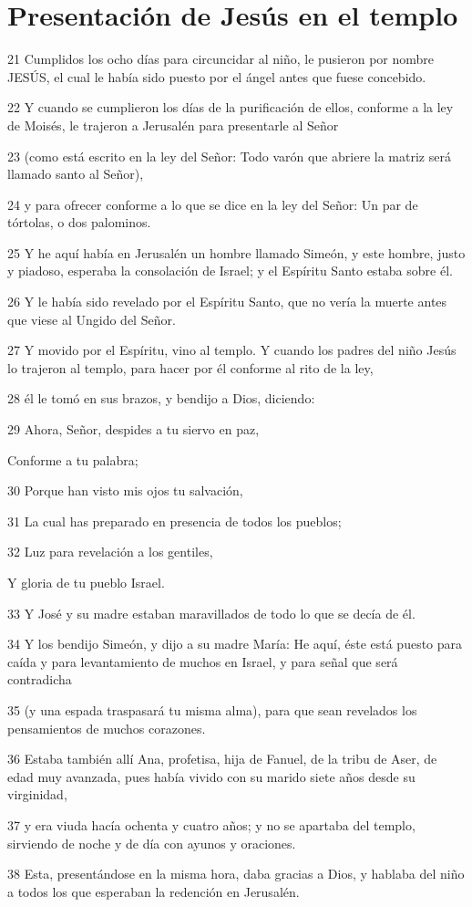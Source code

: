 \section*{Presentación de Jesús en el templo}

\par 21 Cumplidos los ocho días para circuncidar al niño, le pusieron por nombre JESÚS, el cual le había sido puesto por el ángel antes que fuese concebido.
\par 22 Y cuando se cumplieron los días de la purificación de ellos, conforme a la ley de Moisés, le trajeron a Jerusalén para presentarle al Señor
\par 23 (como está escrito en la ley del Señor: Todo varón que abriere la matriz será llamado santo al Señor),
\par 24 y para ofrecer conforme a lo que se dice en la ley del Señor: Un par de tórtolas, o dos palominos.
\par 25 Y he aquí había en Jerusalén un hombre llamado Simeón, y este hombre, justo y piadoso, esperaba la consolación de Israel; y el Espíritu Santo estaba sobre él.
\par 26 Y le había sido revelado por el Espíritu Santo, que no vería la muerte antes que viese al Ungido del Señor.
\par 27 Y movido por el Espíritu, vino al templo. Y cuando los padres del niño Jesús lo trajeron al templo, para hacer por él conforme al rito de la ley,
\par 28 él le tomó en sus brazos, y bendijo a Dios, diciendo:
\par 29 Ahora, Señor, despides a tu siervo en paz,
\par Conforme a tu palabra;
\par 30 Porque han visto mis ojos tu salvación,
\par 31 La cual has preparado en presencia de todos los pueblos;
\par 32 Luz para revelación a los gentiles,
\par Y gloria de tu pueblo Israel.
\par 33 Y José y su madre estaban maravillados de todo lo que se decía de él.
\par 34 Y los bendijo Simeón, y dijo a su madre María: He aquí, éste está puesto para caída y para levantamiento de muchos en Israel, y para señal que será contradicha
\par 35 (y una espada traspasará tu misma alma), para que sean revelados los pensamientos de muchos corazones.
\par 36 Estaba también allí Ana, profetisa, hija de Fanuel, de la tribu de Aser, de edad muy avanzada, pues había vivido con su marido siete años desde su virginidad,
\par 37 y era viuda hacía ochenta y cuatro años; y no se apartaba del templo, sirviendo de noche y de día con ayunos y oraciones.
\par 38 Esta, presentándose en la misma hora, daba gracias a Dios, y hablaba del niño a todos los que esperaban la redención en Jerusalén.

